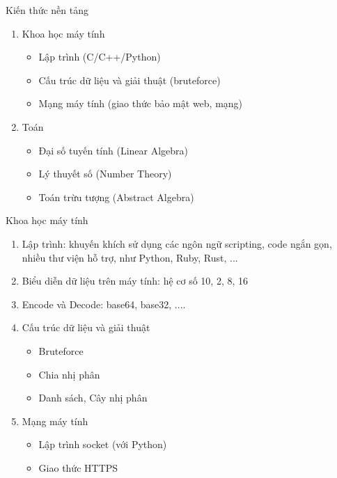 \begin{frame}{Kiến thức nền tảng}
\begin{enumerate}
    \item Khoa học máy tính
    \begin{itemize}
        \item Lập trình (C/C++/Python)
        \item Cấu trúc dữ liệu và giải thuật (bruteforce)
        \item Mạng máy tính (giao thức bảo mật web, mạng)
    \end{itemize}
    \item Toán
    \begin{itemize}
        \item Đại số tuyến tính (Linear Algebra)
        \item Lý thuyết số (Number Theory)
        \item Toán trừu tượng (Abstract Algebra)
    \end{itemize}
\end{enumerate}
\end{frame}
\begin{frame}{Khoa học máy tính}
\begin{enumerate}
    \item Lập trình: khuyến khích sử dụng các ngôn ngữ scripting, code ngắn gọn, nhiều thư viện hỗ trợ, như Python, Ruby, Rust, ...
    \item Biểu diễn dữ liệu trên máy tính: hệ cơ số 10, 2, 8, 16
    \item Encode và Decode: base64, base32, ....
    \item Cấu trúc dữ liệu và giải thuật
    \begin{itemize}
        \item Bruteforce
        \item Chia nhị phân
        \item Danh sách, Cây nhị phân
    \end{itemize} 
    \item Mạng máy tính
    \begin{itemize}
        \item Lập trình socket (với Python)
        \item Giao thức HTTPS
    \end{itemize}
\end{enumerate}
\end{frame}
